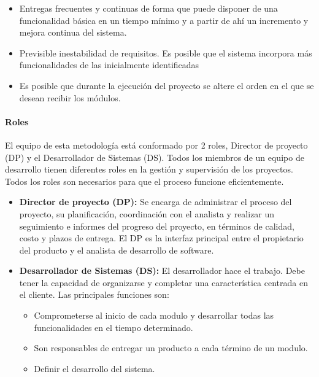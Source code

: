 \documentclass[12pt,a4paper,final, xcolor=table, table]{article}
\begin{document}
	\begin{itemize}
		\item Entregas frecuentes y continuas de forma que puede disponer de una funcionalidad básica en un tiempo mínimo y a partir de ahí un incremento y mejora continua del sistema.
		
		\item Previsible inestabilidad de requisitos. Es posible que el sistema incorpora más funcionalidades de las inicialmente identificadas
		
		\item Es posible que durante la ejecución del proyecto se altere el orden en el que se desean recibir los módulos.
	\end{itemize} 
	
	\paragraph{Roles}
	
	El equipo de esta metodología está conformado por 2 roles, Director de proyecto (DP) y el Desarrollador de Sistemas (DS). Todos los miembros de un equipo de desarrollo tienen diferentes roles en la gestión y supervisión de los proyectos. Todos los roles son necesarios para que el proceso funcione eficientemente. 
	
	\begin{itemize}
		\item \textbf{Director de proyecto (DP):} Se encarga de administrar el proceso del proyecto, su planificación, coordinación con el analista y realizar un seguimiento e informes del progreso del proyecto, en términos de calidad, costo y plazos de entrega. El DP es la interfaz principal entre el propietario del producto y el analista de desarrollo de software.
		
		\item \textbf{Desarrollador de Sistemas (DS):} El desarrollador hace el trabajo. Debe tener la capacidad de organizarse y completar una característica centrada en el cliente. Las principales funciones son:
		
		\begin{itemize}
			\item Comprometerse al inicio de cada modulo y desarrollar todas las funcionalidades en el tiempo determinado.
			
			\item Son responsables de entregar un producto a cada término de un modulo.
			
			\item Definir el desarrollo del sistema.
		\end{itemize} 
	\end{itemize}
\end{document}
